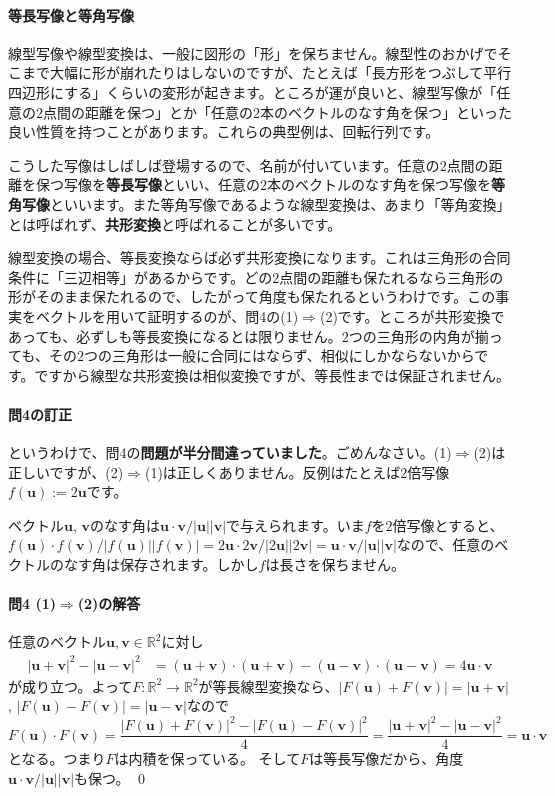 \paragraph{等長写像と等角写像} 

線型写像や線型変換は、一般に図形の「形」を保ちません。線型性のおかげでそこまで大幅に形が崩れたりはしないのですが、たとえば「長方形をつぶして平行四辺形にする」くらいの変形が起きます。ところが運が良いと、線型写像が「任意の$2$点間の距離を保つ」とか「任意の$2$本のベクトルのなす角を保つ」といった良い性質を持つことがあります。これらの典型例は、回転行列です。

こうした写像はしばしば登場するので、名前が付いています。任意の$2$点間の距離を保つ写像を\textbf{等長写像}といい、任意の$2$本のベクトルのなす角を保つ写像を\textbf{等角写像}といいます。また等角写像であるような線型変換は、あまり「等角変換」とは呼ばれず、\textbf{共形変換}と呼ばれることが多いです。

線型変換の場合、等長変換ならば必ず共形変換になります。これは三角形の合同条件に「三辺相等」があるからです。どの$2$点間の距離も保たれるなら三角形の形がそのまま保たれるので、したがって角度も保たれるというわけです。この事実をベクトルを用いて証明するのが、問4の(1)$\Rightarrow$(2)です。ところが共形変換であっても、必ずしも等長変換になるとは限りません。$2$つの三角形の内角が揃っても、その$2$つの三角形は一般に合同にはならず、相似にしかならないからです。ですから線型な共形変換は相似変換ですが、等長性までは保証されません。

\paragraph{問4の訂正} というわけで、問4の\textbf{問題が半分間違っていました}。ごめんなさい。(1)$\Rightarrow$(2)は正しいですが、(2)$\Rightarrow$(1)は正しくありません。反例はたとえば$2$倍写像$f(\bm{u}) := 2\bm{u}$です。

ベクトル$\bm{u}$, $\bm{v}$のなす角は$\bm{u}\cdot\bm{v}/|\bm{u}||\bm{v}|$で与えられます。いま$f$を$2$倍写像とすると、$f(\bm{u})\cdot f(\bm{v})/|f(\bm{u})||f(\bm{v})| = 2\bm{u}\cdot2\bm{v}/|2\bm{u}||2\bm{v}| = \bm{u}\cdot\bm{v}/|\bm{u}||\bm{v}|$なので、任意のベクトルのなす角は保存されます。しかし$f$は長さを保ちません。

\paragraph{問4 (1)$\Rightarrow$(2)の解答} 任意のベクトル$\bm{u}, \bm{v} \in \mathbb{R}^2$に対し
\begin{align*}
|\bm{u} + \bm{v}|^2 - |\bm{u} - \bm{v}|^2
&= (\bm{u} + \bm{v})\cdot(\bm{u} + \bm{v}) - (\bm{u} - \bm{v})\cdot(\bm{u} - \bm{v}) = 4\bm{u}\cdot\bm{v}
\end{align*}
が成り立つ。よって$F\colon\mathbb{R}^2\rightarrow\mathbb{R}^2$が等長線型変換なら、$|F(\bm{u}) + F(\bm{v})| = |\bm{u} + \bm{v}|$, $|F(\bm{u}) - F(\bm{v})| = |\bm{u} - \bm{v}|$なので
\[
F(\bm{u})\cdot F(\bm{v}) = \frac{|F(\bm{u}) + F(\bm{v})|^2 - |F(\bm{u}) - F(\bm{v})|^2}{4}
= \frac{|\bm{u} + \bm{v}|^2 - |\bm{u} - \bm{v}|^2}{4} = \bm{u}\cdot\bm{v}
\]
となる。つまり$F$は内積を保っている。 そして$F$は等長写像だから、角度$\bm{u}\cdot\bm{v}/|\bm{u}||\bm{v}|$も保つ。 \qed

